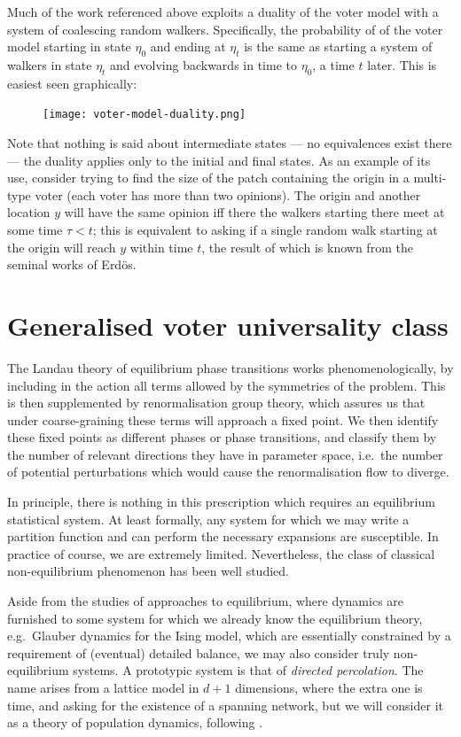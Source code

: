 \documentclass[10pt,english]{report}
\begin{document}
Much of the work referenced above exploits a duality of the voter model with a system of coalescing random walkers. Specifically, the probability of of the voter model starting in state $\eta_0$ and ending at $\eta_t$ is the same as starting a system of walkers in state $\eta_t$ and evolving backwards in time to $\eta_0$, a time $t$ later. This is easiest seen graphically:

\begin{figure}[h]
	\centering
	\texttt{[image: voter-model-duality.png]}
\end{figure}

Note that nothing is said about intermediate states --- no equivalences exist there --- the duality applies only to the initial and final states. As an example of its use, consider trying to find the size of the patch containing the origin in a multi-type voter (each voter has more than two opinions). The origin and another location $y$ will have the same opinion iff there the walkers starting there meet at some time $\tau < t$; this is equivalent to asking if a single random walk starting at the origin will reach $y$ within time $t$, the result of which is known from the seminal works of Erd\"os.

\section{Generalised voter universality class}

The Landau theory of equilibrium phase transitions works phenomenologically, by including in the action all terms allowed by the symmetries of the problem. This is then supplemented by renormalisation group theory, which assures us that under coarse-graining these terms will approach a fixed point. We then identify these fixed points as different phases or phase transitions, and classify them by the number of relevant directions they have in parameter space, i.e.\ the number of potential perturbations which would cause the renormalisation flow to diverge.

In principle, there is nothing in this prescription which requires an equilibrium statistical system. At least formally, any system for which we may write a partition function and can perform the necessary expansions are susceptible. In practice of course, we are extremely limited. Nevertheless, the class of classical non-equilibrium phenomenon has been well studied.

Aside from the studies of approaches to equilibrium, where dynamics are furnished to some system for which we already know the equilibrium theory, e.g.\ Glauber dynamics for the Ising model, which are essentially constrained by a requirement of (eventual) detailed balance, we may also consider truly non-equilibrium systems. A prototypic system is that of \emph{directed percolation}. The name arises from a lattice model in $d+1$ dimensions, where the extra one is time, and asking for the existence of a spanning network, but we will consider it as a theory of population dynamics, following \citet[][chapter 10]{cardybook}.
\end{document}

